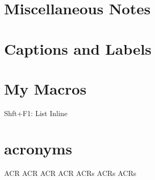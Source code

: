 \section{Miscellaneous Notes}

\section{Captions and Labels}

\section{My Macros}
Shft+F1: List Inline

\section{acronyms}
\ac{ACR}   %
\acl{ACR}  %
\acf{ACR}  %
\acs{ACR}  %
\acp{ACR}  %
\acfp{ACR} %
\aclp{ACR} %


